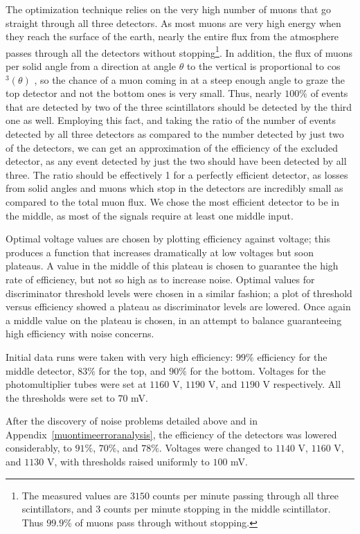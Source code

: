 The optimization technique relies on the very high number of muons that go straight through all three detectors. As most muons are very high energy when they reach the surface of the earth, nearly the entire flux from the atmosphere passes through all the detectors without stopping\footnote{The measured values are $3150$ counts per minute passing through all three scintillators, and $3$ counts per minute stopping in the middle scintillator. Thus $99.9\%$ of muons pass through without stopping.}. In addition, the flux of muons per solid angle from a direction at angle $\theta$ to the vertical is proportional to cos$^3(\theta)$ \cite{frisch}, so the chance of a muon coming in at a steep enough angle to graze the top detector and not the bottom ones is very small. Thus, nearly $100\%$ of events that are detected by two of the three scintillators should be detected by the third one as well. Employing this fact, and taking the ratio of the number of events detected by all three detectors as compared to the number detected by just two of the detectors, we can get an approximation of the efficiency of the excluded detector, as any event detected by just the two should have been detected by all three. The ratio should be effectively 1 for a perfectly efficient detector, as losses from solid angles and muons which stop in the detectors are incredibly small as compared to the total muon flux. We chose the most efficient detector to be in the middle, as most of the signals require at least one middle input.

Optimal voltage values are chosen by plotting efficiency against voltage; this produces a function that increases dramatically at low voltages but soon plateaus. A value in the middle of this plateau is chosen to guarantee the high rate of efficiency, but not so high as to increase noise. Optimal values for discriminator threshold levels were chosen in a similar fashion; a plot of threshold versus efficiency showed a plateau as discriminator levels are lowered. Once again a middle value on the plateau is chosen, in an attempt to balance guaranteeing high efficiency with noise concerns.

Initial data runs were taken with very high efficiency: $99\%$ efficiency for the middle detector, $83\%$ for the top, and $90\%$ for the bottom. Voltages for the photomultiplier tubes were set at $1160$ V, $1190$ V, and $1190$ V respectively. All the thresholds were set to $70$ mV. 

After the discovery of noise problems detailed above and in Appendix~\ref{muontimeerroranalysis}, the efficiency of the detectors was lowered considerably, to $91\%$, $70\%$, and $78\%$. Voltages were changed to $1140$ V, $1160$ V, and $1130$ V, with thresholds raised uniformly to $100$ mV.

